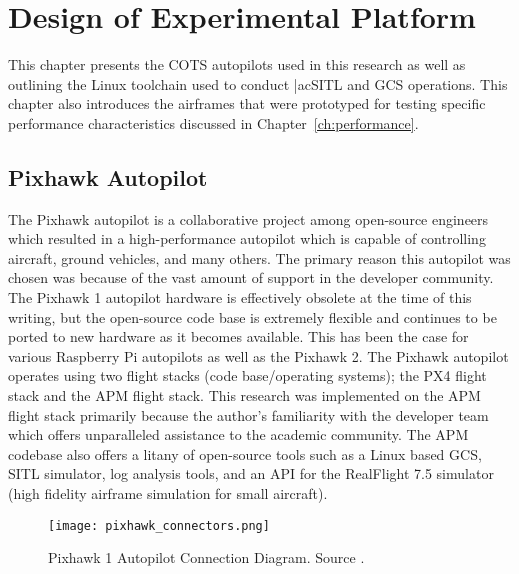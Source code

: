 \chapter{Design of Experimental Platform}\label{ch:platform}

This chapter presents the \ac{COTS} autopilots used in this research as well as outlining the Linux toolchain used to conduct |ac{SITL} and \ac{GCS} operations.  This chapter also introduces the airframes that were prototyped for testing specific performance characteristics discussed in Chapter~\ref{ch:performance}.

\section{Pixhawk Autopilot}
The Pixhawk autopilot is a collaborative project among open-source engineers which resulted in a high-performance autopilot which is capable of controlling aircraft, ground vehicles, and many others.  The primary reason this autopilot was chosen was because of the vast amount of support in the developer community.  The Pixhawk 1 autopilot hardware is effectively obsolete at the time of this writing, but the open-source code base is extremely flexible and continues to be ported to new hardware as it becomes available.  This has been the case for various Raspberry Pi autopilots as well as the Pixhawk 2.  The Pixhawk autopilot operates using two flight stacks (code base/operating systems); the PX4 flight stack and the \ac{APM} flight stack.  This research was implemented on the \ac{APM} flight stack primarily because the author's familiarity with the developer team which offers unparalleled assistance to the academic community.  The \ac{APM} codebase also offers a litany of open-source tools such as a Linux based \ac{GCS}, \ac{SITL} simulator, log analysis tools, and an \ac{API} for the RealFlight 7.5 simulator (high fidelity airframe simulation for small aircraft).

\begin{figure}[h!]
 \centering
  \texttt{[image: pixhawk\_connectors.png]}
  \caption{Pixhawk 1 Autopilot Connection Diagram.  Source \cite{apm_org}.}
  \label{fig:pixhawk_autopilot}
\end{figure}


